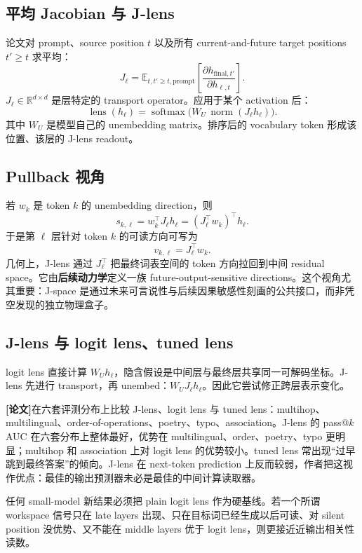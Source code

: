 \documentclass[10.5pt,a4paper]{ctexart}
\newcommand{\Paper}{\textbf{[论文]}}
\begin{document}
\subsection{平均 Jacobian 与 J-lens}
论文对 prompt、source position $t$ 以及所有 current-and-future target positions $t'\ge t$ 求平均：
\[
J_\ell
=
\mathbb{E}_{t,t'\ge t,\mathrm{prompt}}
\left[
\frac{\partial h_{\mathrm{final},t'}}{\partial h_{\ell,t}}
\right].
\]
$J_\ell\in\mathbb{R}^{d\times d}$ 是层特定的 transport operator。应用于某个 activation 后：
\[
\operatorname{lens}(h_\ell)
=
\operatorname{softmax}\!\bigl(
W_U\,\operatorname{norm}(J_\ell h_\ell)
\bigr).
\]
其中 $W_U$ 是模型自己的 unembedding matrix。排序后的 vocabulary token 形成该位置、该层的 J-lens readout。

\subsection{Pullback 视角}
若 $w_k$ 是 token $k$ 的 unembedding direction，则
\[
s_{k,\ell}=w_k^\top J_\ell h_\ell
=(J_\ell^\top w_k)^\top h_\ell.
\]
于是第 $\ell$ 层针对 token $k$ 的可读方向可写为
\[
v_{k,\ell}=J_\ell^\top w_k.
\]
几何上，J-lens 通过 $J_\ell^\top$ 把最终词表空间的 token 方向拉回到中间 residual space。它由\textbf{后续动力学}定义一族 future-output-sensitive directions。这个视角尤其重要：J-space 是通过未来可言说性与后续因果敏感性刻画的公共接口，而非凭空发现的独立物理盒子。

\subsection{J-lens 与 logit lens、tuned lens}
logit lens 直接计算 $W_U h_\ell$，隐含假设是中间层与最终层共享同一可解码坐标。J-lens 先进行 transport，再 unembed：$W_UJ_\ell h_\ell$。因此它尝试修正跨层表示变化。

\Paper 在六套评测分布上比较 J-lens、logit lens 与 tuned lens：multihop、multilingual、order-of-operations、poetry、typo、association。J-lens 的 pass@$k$ AUC 在六套分布上整体最好，优势在 multilingual、order、poetry、typo 更明显；multihop 和 association 上对 logit lens 的优势较小。tuned lens 常出现“过早跳到最终答案”的倾向。J-lens 在 next-token prediction 上反而较弱，作者把这视作优点：最佳的输出预测器未必是最佳的中间计算读取器。

\begin{warningclaim}
任何 small-model 新结果必须把 plain logit lens 作为硬基线。若一个所谓 workspace 信号只在 late layers 出现、只在目标词已经生成以后可读、对 silent position 没优势、又不能在 middle layers 优于 logit lens，则更接近近输出相关性读数。
\end{warningclaim}
\end{document}
